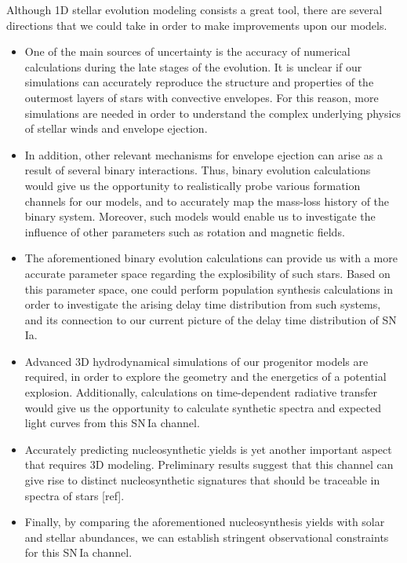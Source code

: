 \documentclass[../../main/thesis_msc.tex]{subfiles}
\begin{document}
		
		Although 1D stellar evolution modeling consists a great tool, there are several directions that we could take in order to make improvements upon our models.
		\begin{itemize}
			\item One of the main sources of uncertainty is the accuracy of numerical calculations during the late stages of the evolution. It is unclear if our simulations can accurately reproduce the structure and properties of the outermost layers of stars with convective envelopes. For this reason, more simulations are needed in order to understand the complex underlying physics of stellar winds and envelope ejection.
			
			\item In addition, other relevant mechanisms for envelope ejection can arise as a result of several binary interactions. Thus, binary evolution calculations would give us the opportunity to realistically probe various formation channels for our models, and to accurately map the mass-loss history of the binary system. Moreover, such models would enable us to investigate the influence of other parameters such as rotation and magnetic fields.
			
			\item  The aforementioned binary evolution calculations can provide us with a more accurate parameter space regarding the explosibility of such stars. Based on this parameter space, one could perform population synthesis calculations in order to investigate the arising delay time distribution from such systems, and its connection to our current picture of the delay time distribution of SN\,Ia.
			
			\item Advanced 3D hydrodynamical simulations of our progenitor models are required, in order to explore the geometry and the energetics of a potential explosion. Additionally, calculations on time-dependent radiative transfer would give us the opportunity to calculate synthetic spectra and expected light curves from this SN\,Ia channel.
			
			\item Accurately predicting nucleosynthetic yields is yet another important aspect that requires 3D modeling. Preliminary results suggest that this channel can give rise to distinct nucleosynthetic signatures that should be traceable in spectra of stars [ref].
			
			\item Finally, by comparing the aforementioned nucleosynthesis yields with solar and stellar abundances, we can establish stringent observational constraints for this SN\,Ia channel.
			
		
		\end{itemize}
		

		
\end{document}
